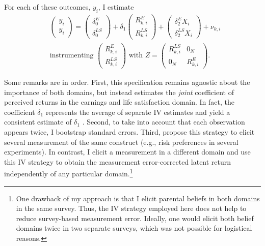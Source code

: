 \documentclass[12pt, a4paper, english]{article}
\begin{document}
For each of these outcomes, $y_i$, I estimate
\begin{align}
    &\left(\begin{array}{c}y_{i}\\y_{i}\end{array}\right) = \left(\begin{array}{c}\delta_0^{E}\\ \delta_0^{LS}\end{array}\right) + \delta_1 \left(\begin{array}{c}R_{k,i}^{E}\\R_{k,i}^{LS}\end{array}\right) + \left(\begin{array}{c}\delta_2^{E}X_i\\\delta_2^{LS}X_i\end{array}\right) + \nu_{k,i} \label{eq:predictivepower}\\
    &\text{instrumenting } \left(\begin{array}{c}R_{k,i}^{E}\\ R_{k,i}^{LS}\end{array}\right) \text{ with } Z=\left(\begin{array}{cc}R_{k,i}^{LS} & 0_{N} \\ 0_{N} & R_{k,i}^{E}\end{array}\right). \nonumber
\end{align}

Some remarks are in order. First, this specification remains agnostic about the importance of both domains, but instead estimates the \textit{joint} coefficient of perceived returns in the earnings and life satisfaction domain. In fact, the coefficient $\delta_1$ represents the average of separate IV estimates and yield a consistent estimate of $\delta_1$ \citep[see][]{Gillenetal2018}. Second, to take into account that each observation appears twice, I bootstrap standard errors. Third, \citet{Gillenetal2018} propose this strategy to elicit several measurement of the same construct (e.g., risk preferences in several experiments). In contrast, I elicit a measurement in a different domain and use this IV strategy to obtain the measurement error-corrected latent return independently of any particular domain.\footnote{One drawback of my approach is that I elicit parental beliefs in both domains in the same survey. Thus, the IV strategy employed here does not help to reduce survey-based measurement error. Ideally, one would elicit both belief domains twice in two separate surveys, which was not possible for logistical reasons.}
\end{document}
